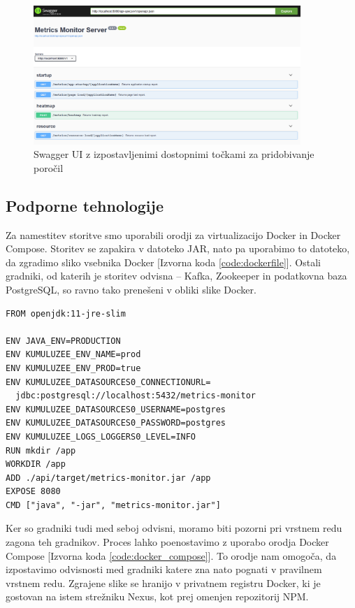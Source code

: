 \documentclass[a4paper, 12pt]{book}
\begin{document}
\begin{figure}[!htb]
	\begin{center}
		\includegraphics[width=0.9\textwidth]{swagger.png}
	\end{center}
	\caption{Swagger UI z izpostavljenimi dostopnimi točkami za pridobivanje poročil}
	\label{img:swagger}
\end{figure}

\subsection{Podporne tehnologije}
\label{ch3:sec2:sub3}

Za namestitev storitve smo uporabili orodji za virtualizacijo Docker in Docker Compose. Storitev se zapakira v datoteko JAR, nato pa uporabimo to datoteko, da zgradimo sliko vsebnika Docker [Izvorna koda \ref{code:dockerfile}]. Ostali gradniki, od katerih je storitev odvisna -- Kafka, Zookeeper in podatkovna baza PostgreSQL, so ravno tako prenešeni v obliki slike Docker.\newline

\begin{lstlisting}[label=code:dockerfile, caption=Dockerfile za storitev, float=h]
FROM openjdk:11-jre-slim

ENV JAVA_ENV=PRODUCTION
ENV KUMULUZEE_ENV_NAME=prod
ENV KUMULUZEE_ENV_PROD=true
ENV KUMULUZEE_DATASOURCES0_CONNECTIONURL=
  jdbc:postgresql://localhost:5432/metrics-monitor
ENV KUMULUZEE_DATASOURCES0_USERNAME=postgres
ENV KUMULUZEE_DATASOURCES0_PASSWORD=postgres
ENV KUMULUZEE_LOGS_LOGGERS0_LEVEL=INFO
RUN mkdir /app
WORKDIR /app
ADD ./api/target/metrics-monitor.jar /app
EXPOSE 8080
CMD ["java", "-jar", "metrics-monitor.jar"]
\end{lstlisting} 

Ker so gradniki tudi med seboj odvisni, moramo biti pozorni pri vrstnem redu zagona teh gradnikov. Proces lahko poenostavimo z uporabo orodja Docker Compose [Izvorna koda \ref{code:docker_compose}]. To orodje nam omogoča, da izpostavimo odvisnosti med gradniki katere zna nato pognati v pravilnem vrstnem redu. Zgrajene slike se hranijo v privatnem registru Docker, ki je gostovan na istem strežniku Nexus, kot prej omenjen repozitorij NPM.
\end{document}

